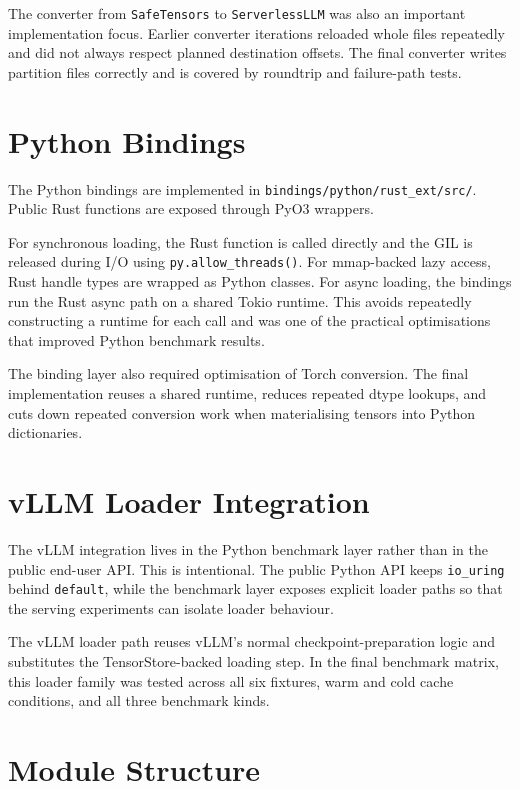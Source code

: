 The converter from \texttt{SafeTensors} to \texttt{ServerlessLLM} was also an important implementation focus. Earlier converter iterations reloaded whole files repeatedly and did not always respect planned destination offsets. The final converter writes partition files correctly and is covered by roundtrip and failure-path tests.

\section{Python Bindings}

The Python bindings are implemented in \texttt{bindings/python/rust\_ext/src/}. Public Rust functions are exposed through PyO3 wrappers.

For synchronous loading, the Rust function is called directly and the GIL is released during I/O using \texttt{py.allow\_threads()}. For mmap-backed lazy access, Rust handle types are wrapped as Python classes. For async loading, the bindings run the Rust async path on a shared Tokio runtime. This avoids repeatedly constructing a runtime for each call and was one of the practical optimisations that improved Python benchmark results.

The binding layer also required optimisation of Torch conversion. The final implementation reuses a shared runtime, reduces repeated dtype lookups, and cuts down repeated conversion work when materialising tensors into Python dictionaries.

\section{vLLM Loader Integration}

The vLLM integration lives in the Python benchmark layer rather than in the public end-user API. This is intentional. The public Python API keeps \texttt{io\_uring} behind \texttt{default}, while the benchmark layer exposes explicit loader paths so that the serving experiments can isolate loader behaviour.

The vLLM loader path reuses vLLM's normal checkpoint-preparation logic and substitutes the TensorStore-backed loading step. In the final benchmark matrix, this loader family was tested across all six fixtures, warm and cold cache conditions, and all three benchmark kinds.

\section{Module Structure}

